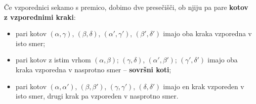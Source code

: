             
                Če vzporednici sekamo s premico, dobimo dve presečišči, ob njiju pa pare \textbf{kotov z vzporednimi kraki}:
                

                \begin{itemize}
                    \item pari kotov $(\alpha, \gamma)$, $(\beta, \delta)$, $(\alpha', \gamma')$, $(\beta', \delta')$ imajo oba kraka vzporedna v isto smer;
                    \item pari kotov z istim vrhom $(\alpha, \beta)$; $(\gamma, \delta)$, $(\alpha', \beta')$; $(\gamma', \delta')$ imajo oba kraka vzporedna v nasprotno smer -- \textbf{sovršni koti};
                    \item pari kotov $(\alpha, \alpha')$, $(\beta, \beta')$, $(\gamma,\gamma')$, $(\delta,\delta')$ imajo en krak vzporeden v isto smer, drugi krak pa vzporeden v nasprotno smer.
                \end{itemize}

